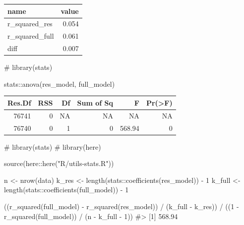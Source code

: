\documentclass[
  12pt,
  a4paper,
  oneside]{tesesusp}
\newenvironment{Shaded}{\begin{snugshade}}{\end{snugshade}}
\newcommand{\CommentTok}[1]{\textcolor[rgb]{0.37,0.37,0.37}{#1}}
\newcommand{\DecValTok}[1]{\textcolor[rgb]{0.68,0.00,0.00}{#1}}
\newcommand{\FunctionTok}[1]{\textcolor[rgb]{0.28,0.35,0.67}{#1}}
\newcommand{\NormalTok}[1]{\textcolor[rgb]{0.00,0.23,0.31}{#1}}
\newcommand{\OtherTok}[1]{\textcolor[rgb]{0.00,0.23,0.31}{#1}}
\newcommand{\SpecialCharTok}[1]{\textcolor[rgb]{0.37,0.37,0.37}{#1}}
\newcommand{\StringTok}[1]{\textcolor[rgb]{0.13,0.47,0.30}{#1}}
\begin{document}
\begin{table}
\centering
\begin{tabular}{l|r}
\hline
name & value\\
\hline
r\_squared\_res & 0.054\\
\hline
r\_squared\_full & 0.061\\
\hline
diff & 0.007\\
\hline
\end{tabular}
\end{table}

\begin{Shaded}
\begin{Highlighting}[numbers=left,,]
\CommentTok{\# library(stats)}

\NormalTok{stats}\SpecialCharTok{::}\FunctionTok{anova}\NormalTok{(res\_model, full\_model)}
\end{Highlighting}
\end{Shaded}

\begin{table}
\centering
\begin{tabular}{r|r|r|r|r|r}
\hline
Res.Df & RSS & Df & Sum of Sq & F & Pr(>F)\\
\hline
76741 & 0 & NA & NA & NA & NA\\
\hline
76740 & 0 & 1 & 0 & 568.94 & 0\\
\hline
\end{tabular}
\end{table}

\begin{Shaded}
\begin{Highlighting}[numbers=left,,]
\CommentTok{\# library(stats)}
\CommentTok{\# library(here)}

\FunctionTok{source}\NormalTok{(here}\SpecialCharTok{::}\FunctionTok{here}\NormalTok{(}\StringTok{"R/utils{-}stats.R"}\NormalTok{))}

\NormalTok{n }\OtherTok{\textless{}{-}} \FunctionTok{nrow}\NormalTok{(data)}
\NormalTok{k\_res }\OtherTok{\textless{}{-}} \FunctionTok{length}\NormalTok{(stats}\SpecialCharTok{::}\FunctionTok{coefficients}\NormalTok{(res\_model)) }\SpecialCharTok{{-}} \DecValTok{1}
\NormalTok{k\_full }\OtherTok{\textless{}{-}} \FunctionTok{length}\NormalTok{(stats}\SpecialCharTok{::}\FunctionTok{coefficients}\NormalTok{(full\_model)) }\SpecialCharTok{{-}} \DecValTok{1}

\NormalTok{((}\FunctionTok{r\_squared}\NormalTok{(full\_model) }\SpecialCharTok{{-}} \FunctionTok{r\_squared}\NormalTok{(res\_model)) }\SpecialCharTok{/}\NormalTok{ (k\_full }\SpecialCharTok{{-}}\NormalTok{ k\_res)) }\SpecialCharTok{/}\NormalTok{ ((}\DecValTok{1} \SpecialCharTok{{-}} \FunctionTok{r\_squared}\NormalTok{(full\_model)) }\SpecialCharTok{/}\NormalTok{ (n  }\SpecialCharTok{{-}}\NormalTok{ k\_full }\SpecialCharTok{{-}} \DecValTok{1}\NormalTok{))}
\CommentTok{\#\textgreater{} [1] 568.94}
\end{Highlighting}
\end{Shaded}
\end{document}

